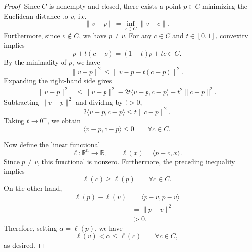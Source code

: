 	\begin{proof}
		Since $C$ is nonempty and closed, there exists a point $p \in C$ minimizing the Euclidean distance to $v$, i.e.
		\begin{equation}
			\|v-p\| = \inf_{c \in C} \|v-c\|.
		\end{equation}
		Furthermore, since $v \notin C$, we have $p \neq v$. For any $c \in C$ and $t \in [0,1]$, convexity implies
		\begin{equation}
			p + t(c-p) = (1-t)p + tc \in C.
		\end{equation}
		By the minimality of $p$, we have
		\begin{equation}
			\|v-p\|^2 \leq \|v-p-t(c-p)\|^2.
		\end{equation}
		Expanding the right-hand side gives
		\begin{align}
			\|v-p\|^2 &\leq \|v-p\|^2 - 2t\langle v-p,c-p\rangle + t^2\|c-p\|^2.
		\end{align}
		Subtracting $\|v-p\|^2$ and dividing by $t>0$,
		\begin{equation}
			2\langle v-p,c-p\rangle \leq t\|c-p\|^2.
		\end{equation}
		Taking $t \to 0^+$, we obtain
		\begin{equation}
			\langle v-p,c-p\rangle \leq 0 \qquad \forall c \in C.
		\end{equation}

		Now define the linear functional
		\begin{equation}
			\ell: \mathbb{R}^n \to \mathbb{R}, \qquad \ell(x) = \langle p-v,x\rangle.
		\end{equation}
		Since $p \neq v$, this functional is nonzero. Furthermore, the preceding inequality implies
		\begin{equation}
			\ell(c) \geq \ell(p) \qquad \forall c \in C.
		\end{equation}
		On the other hand,
		\begin{align}
			\ell(p) - \ell(v)
			&= \langle p-v,p-v\rangle \\
			&= \|p-v\|^2 \\
			&> 0.
		\end{align}
		Therefore, setting $\alpha = \ell(p)$, we have
		\begin{equation}
			\ell(v) < \alpha \leq \ell(c)
			\qquad \forall c \in C,
		\end{equation}
		as desired.
	\end{proof}

